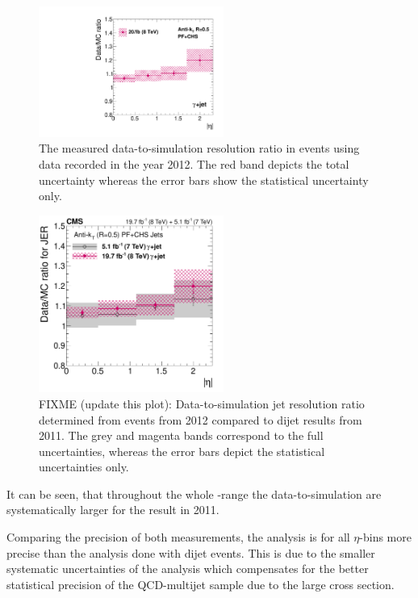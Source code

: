 \begin{figure}[!t]
 \centering
    \includegraphics[width=0.54\textwidth]{figures/resolution/results/MySingleFinalResult.pdf}
  \caption{The measured data-to-simulation resolution ratio in \GAMJET events using data recorded in the year 2012.
           The red band depicts the total uncertainty whereas the error bars show the statistical uncertainty only.}
  \label{res:fig:RatioFinal}
\end{figure}
\begin{figure}[!b]
 \centering
    \includegraphics[width=0.54\textwidth]{figures/resolution/results/resultsComparisonFINAL.pdf}
  \caption{FIXME (update this plot): Data-to-simulation jet \pt resolution ratio determined from \GAMJET events from 2012 compared to dijet results from 2011.
           The grey and magenta bands correspond to the full uncertainties, whereas the error bars depict the statistical uncertainties only.}
  \label{res:fig:Comparison_2011}
\end{figure}

It can be seen, that throughout the whole \etajet-range the data-to-simulation are systematically larger for the result in 2011. 

Comparing the precision of both measurements, the \GAMJET analysis is for all $\eta$-bins more precise than the analysis done with dijet events.
This is due to the smaller systematic uncertainties of the \GAMJET analysis which compensates for the better statistical precision of the QCD-multijet sample due to the large cross section.


